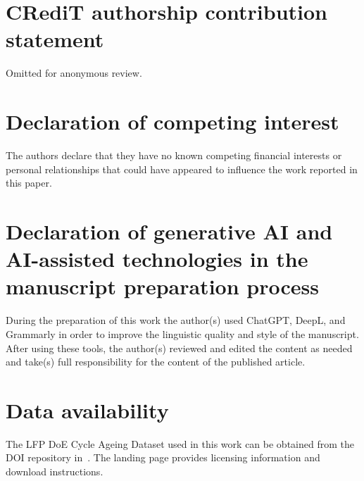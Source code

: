 \documentclass[review]{elsarticle}
\begin{document}
\section*{CRediT authorship contribution statement}
Omitted for anonymous review.

\section*{Declaration of competing interest}
The authors declare that they have no known competing financial interests or personal relationships that could have appeared to influence the work reported in this paper.
\section*{Declaration of generative AI and AI-assisted technologies in the manuscript preparation process}
During the preparation of this work the author(s) used ChatGPT, DeepL, and Grammarly in order to improve the linguistic quality and style of the manuscript. After using these tools, the author(s) reviewed and edited the content as needed and take(s) full responsibility for the content of the published article.

\section*{Data availability}
The LFP DoE Cycle Ageing Dataset used in this work can be obtained from the DOI repository in~\cite{LFP_DoE_Cycle_Aging_Dataset}. The landing page provides licensing information and download instructions.



\end{document}

